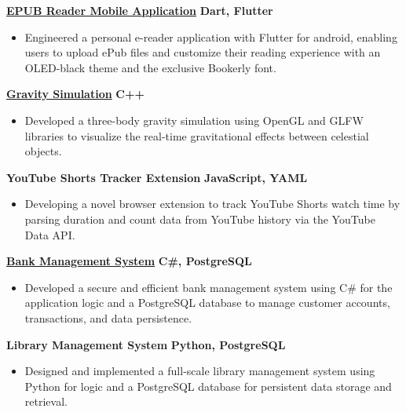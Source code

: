 \documentclass[letterpaper,10pt]{article} %
\begin{document}
\textbf{\href{https://github.com/Ashwani564/My-Library}{EPUB Reader Mobile Application}} \hfill \textbf{Dart, Flutter}
\begin{itemize}
    \item Engineered a personal e-reader application with Flutter for android, enabling users to upload ePub files and customize their reading experience with an OLED-black theme and the exclusive Bookerly font.
\end{itemize}

\textbf{\href{https://github.com/Ashwani564/gravity_simulation}{Gravity Simulation}} \hfill \textbf{C++}
\begin{itemize}
    \item Developed a three-body gravity simulation using OpenGL and GLFW libraries to visualize the real-time gravitational effects between celestial objects. %
\end{itemize}

\textbf{YouTube Shorts Tracker Extension} \hfill \textbf{JavaScript, YAML}
\begin{itemize}
    \item Developing a novel browser extension to track YouTube Shorts watch time by parsing duration and count data from YouTube history via the YouTube Data API. %
\end{itemize}

\textbf{\href{https://github.com/Ashwani564/Bank-Management-System}{Bank Management System}} \hfill \textbf{C\#, PostgreSQL}
\begin{itemize}
    \item Developed a secure and efficient bank management system using C\# for the application logic and a PostgreSQL database to manage customer accounts, transactions, and data persistence. %
\end{itemize}

\textbf{Library Management System} \hfill \textbf{Python, PostgreSQL}
\begin{itemize}
    \item Designed and implemented a full-scale library management system using Python for logic and a PostgreSQL database for persistent data storage and retrieval. %
\end{itemize}
\end{document}
